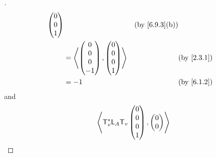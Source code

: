 \begin{proof}[]
\begin{align*}
{\begin{pmatrix}
                                                                                       0 \\
                                                                                       0 \\
                                                                                       1
                                                                                     \end{pmatrix}} &  & \by{6.9.3}[b] \\
                                         & = \inn{\begin{pmatrix}
                                                      0 \\
                                                      0 \\
                                                      0 \\
                                                      -1
                                                    \end{pmatrix}, \begin{pmatrix}
                                                                     0 \\
                                                                     0 \\
                                                                     0 \\
                                                                     1
                                                                   \end{pmatrix}} &  & \by{2.3.1}                      \\
                                         & = -1                           &  & \by{6.1.2}
  \end{align*}
  and
  \begin{align*}
    \left\langle\mathsf{T}_v^* \mathsf{L}_A \mathsf{T}_v\begin{pmatrix}
                             0 \\
                             0 \\
                             0 \\
                             1
                           \end{pmatrix}, \begin{pmatrix}
                                            0 \\
                                            0 \\

\end{pmatrix}\right\rangle
\end{align*}
\end{proof}
